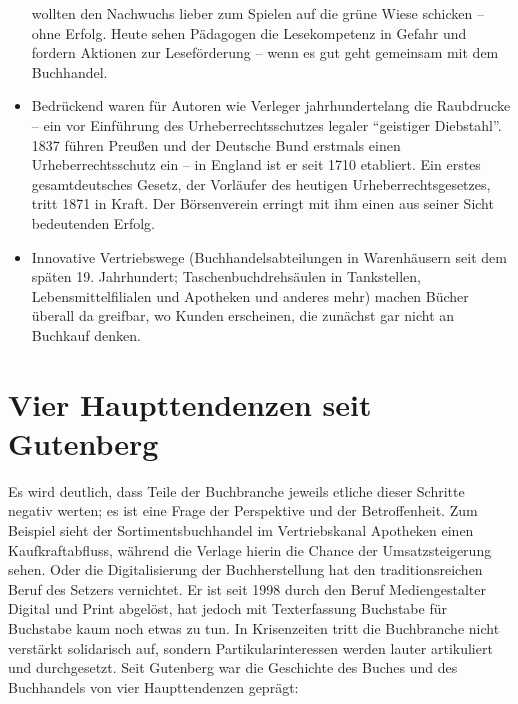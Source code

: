 \documentclass[a4paper,
fontsize=11pt,
oneside,
numbers=noperiodatend,
parskip=half-,
bibliography=totoc,
final
]{scrartcl}
\begin{document}
\begin{itemize}
  wollten den Nachwuchs lieber zum Spielen auf die grüne Wiese schicken
  -- ohne Erfolg. Heute sehen Pädagogen die Lesekompetenz in Gefahr und
  fordern Aktionen zur Leseförderung -- wenn es gut geht gemeinsam mit
  dem Buchhandel.
\item
  Bedrückend waren für Autoren wie Verleger jahrhundertelang die
  Raubdrucke -- ein vor Einführung des Urheberrechtsschutzes legaler
  \enquote{geistiger Diebstahl}. 1837 führen Preußen und der Deutsche
  Bund erstmals einen Urheberrechtsschutz ein -- in England ist er seit
  1710 etabliert. Ein erstes gesamtdeutsches Gesetz, der Vorläufer des
  heutigen Urheberrechtsgesetzes, tritt 1871 in Kraft. Der Börsenverein
  erringt mit ihm einen aus seiner Sicht bedeutenden Erfolg.
\item
  Innovative Vertriebswege (Buchhandelsabteilungen in Warenhäusern seit
  dem späten 19. Jahrhundert; Taschenbuchdrehsäulen in Tankstellen,
  Lebensmittelfilialen und Apotheken und anderes mehr) machen Bücher
  überall da greifbar, wo Kunden erscheinen, die zunächst gar nicht an
  Buchkauf denken.
\end{itemize}

\hypertarget{vier-haupttendenzen-seit-gutenberg}{%
\section{Vier Haupttendenzen seit
Gutenberg}\label{vier-haupttendenzen-seit-gutenberg}}

Es wird deutlich, dass Teile der Buchbranche jeweils etliche dieser
Schritte negativ werten; es ist eine Frage der Perspektive und der
Betroffenheit. Zum Beispiel sieht der Sortimentsbuchhandel im
Vertriebskanal Apotheken einen Kaufkraftabfluss, während die Verlage
hierin die Chance der Umsatzsteigerung sehen. Oder die Digitalisierung
der Buchherstellung hat den traditionsreichen Beruf des Setzers
vernichtet. Er ist seit 1998 durch den Beruf Mediengestalter Digital und
Print abgelöst, hat jedoch mit Texterfassung Buchstabe für Buchstabe
kaum noch etwas zu tun. In Krisenzeiten tritt die Buchbranche nicht
verstärkt solidarisch auf, sondern Partikularinteressen werden lauter
artikuliert und durchgesetzt. Seit Gutenberg war die Geschichte des
Buches und des Buchhandels von vier Haupttendenzen geprägt:
\end{document}
